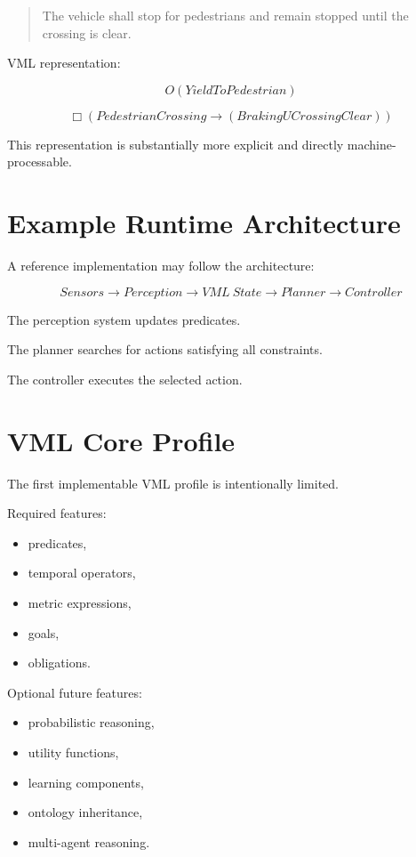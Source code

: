 \documentclass[11pt,a4paper]{article}
\begin{document}
\begin{quote}
The vehicle shall stop for pedestrians and remain stopped until the
crossing is clear.
\end{quote}

VML representation:

\[
O(YieldToPedestrian)
\]

\[
\Box
(
PedestrianCrossing
\rightarrow
(
Braking
U
CrossingClear
)
)
\]

This representation is substantially more explicit and directly
machine-processable.

\section{Example Runtime Architecture}

A reference implementation may follow the architecture:

\[
Sensors
\rightarrow
Perception
\rightarrow
VML\ State
\rightarrow
Planner
\rightarrow
Controller
\]

The perception system updates predicates.

The planner searches for actions satisfying all constraints.

The controller executes the selected action.

\section{VML Core Profile}

The first implementable VML profile is intentionally limited.

Required features:

\begin{itemize}
\item predicates,
\item temporal operators,
\item metric expressions,
\item goals,
\item obligations.
\end{itemize}

Optional future features:

\begin{itemize}
\item probabilistic reasoning,
\item utility functions,
\item learning components,
\item ontology inheritance,
\item multi-agent reasoning.
\end{itemize}
\end{document}
